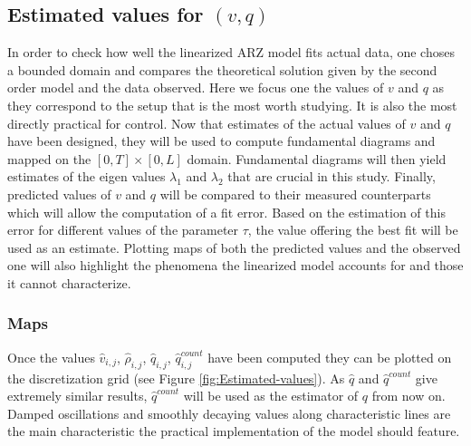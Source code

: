 \documentclass[preprint]{elsarticle}
\begin{document}
\subsection{Estimated values for $\left(v,q\right)$}

In order to check how well the linearized ARZ model fits actual data,
one choses a bounded domain and compares the theoretical solution
given by the second order model and the data observed. Here we focus
one the values of $v$ and $q$ as they correspond to the setup that
is the most worth studying. It is also the most directly practical
for control. Now that estimates of the actual values of $v$ and $q$
have been designed, they will be used to compute fundamental diagrams
and mapped on the $\left[0,T\right]\times\left[0,L\right]$ domain.
Fundamental diagrams will then yield estimates of the eigen values
$\lambda_{1}$ and $\lambda_{2}$ that are crucial in this study.
Finally, predicted values of $v$ and $q$ will be compared to their
measured counterparts which will allow the computation of a fit error.
Based on the estimation of this error for different values of the
parameter $\tau$, the value offering the best fit will be used
as an estimate. Plotting maps of both the predicted values and the
observed one will also highlight the phenomena the linearized model
accounts for and those it cannot characterize.


\subsubsection{Maps}

Once the values $\widehat{v}_{i,j}$, $\widehat{\rho}_{i,j}$, $\widehat{q}_{i,j}$,
$\widehat{q}_{i,j}^{count}$ have been computed they can be plotted
on the discretization grid (see Figure \ref{fig:Estimated-values}).
As $\widehat{q}$ and $\widehat{q}^{count}$ give extremely similar
results, $\widehat{q}^{count}$ will be used as the estimator of $q$
from now on.
Damped oscillations
and smoothly decaying values along characteristic lines are the main characteristic the practical implementation of the model should feature.
\end{document}
